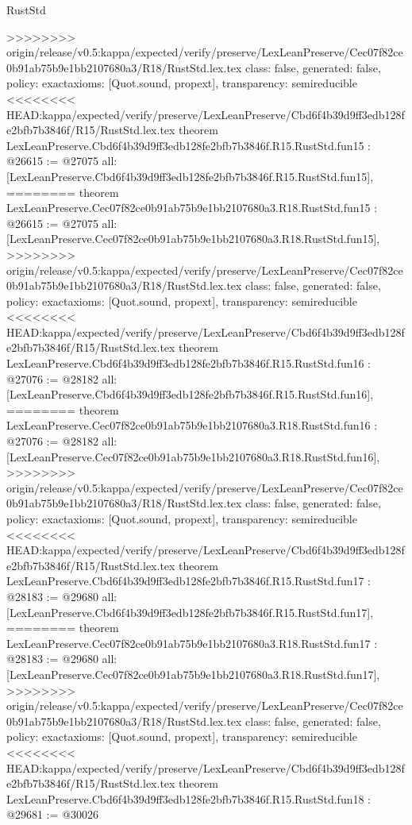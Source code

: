 \begin{lexlean}{RustStd}
\begin{coremodule}
{\begin{coremodule}
{{{{{{{{{{{{{{{{{{>>>>>>>> origin/release/v0.5:kappa/expected/verify/preserve/LexLeanPreserve/Cec07f82ce0b91ab75b9e1bb2107680a3/R18/RustStd.lex.tex
  class: false,
  generated: false,
  policy: exact{axioms: [Quot.sound, propext]},
  transparency: semireducible
}
<<<<<<<< HEAD:kappa/expected/verify/preserve/LexLeanPreserve/Cbd6f4b39d9ff3edb128fe2bfb7b3846f/R15/RustStd.lex.tex
theorem LexLeanPreserve.Cbd6f4b39d9ff3edb128fe2bfb7b3846f.R15.RustStd.fun15 : @26615 := @27075 {
  all: [LexLeanPreserve.Cbd6f4b39d9ff3edb128fe2bfb7b3846f.R15.RustStd.fun15],
========
theorem LexLeanPreserve.Cec07f82ce0b91ab75b9e1bb2107680a3.R18.RustStd.fun15 : @26615 := @27075 {
  all: [LexLeanPreserve.Cec07f82ce0b91ab75b9e1bb2107680a3.R18.RustStd.fun15],
>>>>>>>> origin/release/v0.5:kappa/expected/verify/preserve/LexLeanPreserve/Cec07f82ce0b91ab75b9e1bb2107680a3/R18/RustStd.lex.tex
  class: false,
  generated: false,
  policy: exact{axioms: [Quot.sound, propext]},
  transparency: semireducible
}
<<<<<<<< HEAD:kappa/expected/verify/preserve/LexLeanPreserve/Cbd6f4b39d9ff3edb128fe2bfb7b3846f/R15/RustStd.lex.tex
theorem LexLeanPreserve.Cbd6f4b39d9ff3edb128fe2bfb7b3846f.R15.RustStd.fun16 : @27076 := @28182 {
  all: [LexLeanPreserve.Cbd6f4b39d9ff3edb128fe2bfb7b3846f.R15.RustStd.fun16],
========
theorem LexLeanPreserve.Cec07f82ce0b91ab75b9e1bb2107680a3.R18.RustStd.fun16 : @27076 := @28182 {
  all: [LexLeanPreserve.Cec07f82ce0b91ab75b9e1bb2107680a3.R18.RustStd.fun16],
>>>>>>>> origin/release/v0.5:kappa/expected/verify/preserve/LexLeanPreserve/Cec07f82ce0b91ab75b9e1bb2107680a3/R18/RustStd.lex.tex
  class: false,
  generated: false,
  policy: exact{axioms: [Quot.sound, propext]},
  transparency: semireducible
}
<<<<<<<< HEAD:kappa/expected/verify/preserve/LexLeanPreserve/Cbd6f4b39d9ff3edb128fe2bfb7b3846f/R15/RustStd.lex.tex
theorem LexLeanPreserve.Cbd6f4b39d9ff3edb128fe2bfb7b3846f.R15.RustStd.fun17 : @28183 := @29680 {
  all: [LexLeanPreserve.Cbd6f4b39d9ff3edb128fe2bfb7b3846f.R15.RustStd.fun17],
========
theorem LexLeanPreserve.Cec07f82ce0b91ab75b9e1bb2107680a3.R18.RustStd.fun17 : @28183 := @29680 {
  all: [LexLeanPreserve.Cec07f82ce0b91ab75b9e1bb2107680a3.R18.RustStd.fun17],
>>>>>>>> origin/release/v0.5:kappa/expected/verify/preserve/LexLeanPreserve/Cec07f82ce0b91ab75b9e1bb2107680a3/R18/RustStd.lex.tex
  class: false,
  generated: false,
  policy: exact{axioms: [Quot.sound, propext]},
  transparency: semireducible
}
<<<<<<<< HEAD:kappa/expected/verify/preserve/LexLeanPreserve/Cbd6f4b39d9ff3edb128fe2bfb7b3846f/R15/RustStd.lex.tex
theorem LexLeanPreserve.Cbd6f4b39d9ff3edb128fe2bfb7b3846f.R15.RustStd.fun18 : @29681 := @30026 {
}}}}}}}}}}}}}}}}}}}}}
\end{coremodule}}
\end{coremodule}
\end{lexlean}
